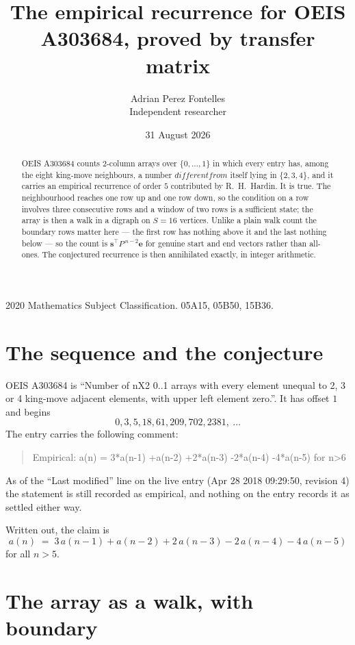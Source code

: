 \documentclass[11pt,a4paper]{article}
\title{The empirical recurrence for OEIS A303684, proved by transfer matrix}
\author{Adrian Perez Fontelles\\ \small Independent researcher}
\date{31 August 2026}
\theoremstyle{plain}
\theoremstyle{definition}
\begin{document}
\maketitle

\begin{abstract}
OEIS A303684 counts $2$-column arrays over $\{0,\dots,1\}$ in which every entry has,
among the eight king-move neighbours, a number $different from$ itself lying in $\{2,3,4\}$, and it carries an empirical
recurrence of order $5$ contributed by R.~H.~Hardin. It is true. The neighbourhood
reaches one row up and one row down, so the condition on a row involves three consecutive
rows and a window of two rows is a sufficient state; the array is then a walk in a digraph
on $S=16$ vertices. Unlike a plain walk count the boundary rows matter here --- the first
row has nothing above it and the last nothing below --- so the count is
$\mathbf{s}^{\!\top}P^{\,n-2}\mathbf{e}$ for genuine start and end vectors rather than
all-ones. The conjectured recurrence is then annihilated exactly, in integer arithmetic.
\end{abstract}

\noindent\small 2020 Mathematics Subject Classification. 05A15, 05B50, 15B36.\normalsize

\section{The sequence and the conjecture}

OEIS A303684 is ``Number of nX2 0..1 arrays with every element unequal to 2, 3 or 4 king-move adjacent elements, with upper left element zero.''. It has offset
$1$ and begins
\[
0, 3, 5, 18, 61, 209, 702, 2381,\ \dots
\]
The entry carries the following comment:
\begin{quote}\small
Empirical: a(n) = 3*a(n-1) +a(n-2) +2*a(n-3) -2*a(n-4) -4*a(n-5) for n>6
\end{quote}
As of the ``Last modified'' line on the live entry (Apr 28 2018 09:29:50, revision
4) the statement is still recorded as empirical, and nothing on the entry
records it as settled either way.

Written out, the claim is
\begin{equation}\label{eq:conj}
a(n)\;=\;3\,a(n-1) + a(n-2) + 2\,a(n-3) - 2\,a(n-4) - 4\,a(n-5)
\end{equation}
for all $n>5$.

\section{The array as a walk, with boundary}
\end{document}
